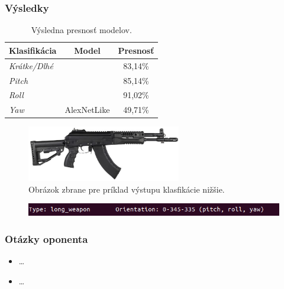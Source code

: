 \documentclass[10pt,xcolor=pdflatex]{beamer}
\begin{document}
\begin{frame}\frametitle{Výsledky}
    \begin{table}
        \begin{tabular}{ l | c | c }
            \textbf{Klasifikácia}   & \textbf{Model}                    & \textbf{Presnosť}   \\
            \hline \hline
            \textit{Krátke/Dlhé}    &                                   & {83,14\%}           \\
            \hline
            \textit{Pitch}          &                                   & {85,14\%}           \\
            \textit{Roll}           &                                   & {91,02\%}           \\
            \textit{Yaw}            & \multirow{-4}{*}{AlexNetLike}     & {49,71\%}
        \end{tabular}
        \caption{Výsledna presnosť modelov.}
    \end{table}

    \begin{figure}[H]
        \centering
        \includegraphics[width=0.6\textwidth]{img/prediction-weapon}
        \caption{Obrázok zbrane pre príklad výstupu klasfikácie nižšie.}
    \end{figure}

    \begin{figure}[H]
        \centering
        \includegraphics[width=1\textwidth]{img/result-prediction}
    \end{figure}

\end{frame}



\begin{frame}\frametitle{Otázky oponenta}
    \begin{itemize}
        \item \dots
        \item \dots
    \end{itemize}
\end{frame}
\end{document}
